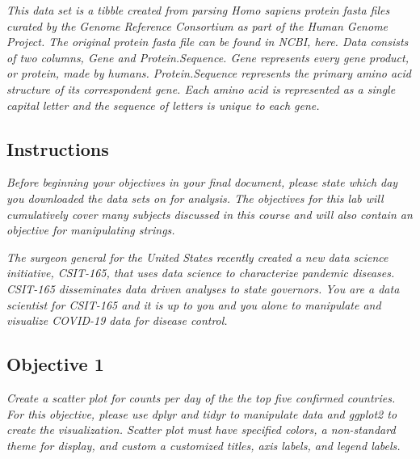 \documentclass[
]{article}
\begin{document}
\emph{This data set is a tibble created from parsing Homo sapiens
protein fasta files curated by the Genome Reference Consortium as part
of the Human Genome Project. The original protein fasta file can be
found in NCBI, here. Data consists of two columns, Gene and
Protein.Sequence. Gene represents every gene product, or protein, made
by humans. Protein.Sequence represents the primary amino acid structure
of its correspondent gene. Each amino acid is represented as a single
capital letter and the sequence of letters is unique to each gene.}

\subsection{Instructions}\label{instructions}

\emph{Before beginning your objectives in your final document, please
state which day you downloaded the data sets on for analysis. The
objectives for this lab will cumulatively cover many subjects discussed
in this course and will also contain an objective for manipulating
strings.}

\emph{The surgeon general for the United States recently created a new
data science initiative, CSIT-165, that uses data science to
characterize pandemic diseases. CSIT-165 disseminates data driven
analyses to state governors. You are a data scientist for CSIT-165 and
it is up to you and you alone to manipulate and visualize COVID-19 data
for disease control.}

\subsection{Objective 1}\label{objective-1}

\emph{Create a scatter plot for counts per day of the the top five
confirmed countries. For this objective, please use dplyr and tidyr to
manipulate data and ggplot2 to create the visualization. Scatter plot
must have specified colors, a non-standard theme for display, and custom
a customized titles, axis labels, and legend labels.}
\end{document}
